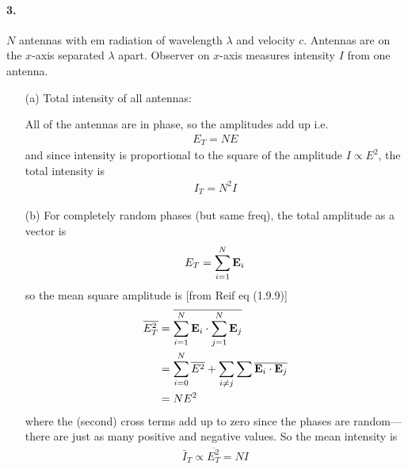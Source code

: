 \documentclass[../main.tex]{subfiles}
\begin{document}
\newpage
\paragraph{3.} $N$ antennas with em radiation of wavelength $\lambda$ and velocity $c$. Antennas are on the $x$-axis separated $\lambda$ apart.
Observer on $x$-axis measures intensity $I$ from one antenna.
\begin{itemize}
    \item [(a)] Total intensity of all antennas:

    All of the antennas are in phase, so the amplitudes add up i.e.
    \begin{align*}
        E_T = NE
    \end{align*}
    and since intensity is proportional to the square of the amplitude $I \propto E^2$, the total intensity is
    \begin{align*}
        I_T = N^2 I
    \end{align*}
    \item[(b)] For completely random phases (but same freq), the total amplitude as a vector is
    \begin{align*}
        E_T = \sum_{i=1}^N \vb E_i
    \end{align*}
    so the mean square amplitude is [from Reif eq (1.9.9)]
    \begin{align*}
        \overline{E_T^2} &= \overline{\sum_{i=1}^N \vb E_i \cdot \sum_{j=1}^N \vb E_j} \\
        &= \sum_{i = 0}^N \overline{E^2}  + \sum_{i \neq j}\sum \overline{\vb E_i \cdot \vb E_j} \\
        &= N E^2
    \end{align*}
    where the (second) cross terms add up to zero since the phases are random--- there are just as many positive and negative values.
    So the mean intensity is
    \begin{align*}
        \bar I_T \propto \overline{E_T^2} = N I
    \end{align*}
\end{itemize}

\newpage
\end{document}

